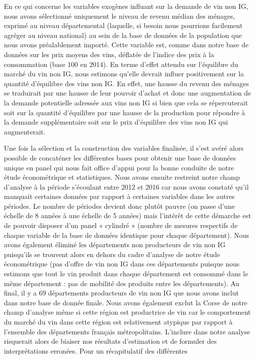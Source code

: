 \documentclass[11pt,]{article}
\begin{document}
En ce qui concerne les variables exogènes influant sur la demande de vin
non IG, nous avons sélectionné uniquement le niveau de revenu médian des
ménages, exprimé au niveau départemental (laquelle, si besoin nous
pourrions facilement agréger au niveau national) au sein de la base de
données de la population que nous avons préalablement importé. Cette
variable est, comme dans notre base de données sur les prix moyens des
vins, déflatée de l'indice des prix à la consommation (base 100 en
2014). En terme d'effet attendu sur l'équilibre du marché du vin non IG,
nous estimons qu'elle devrait influer positivement sur la quantité
d'équilibre des vins non IG. En effet, une hausse du revenu des ménages
se traduirait par une hausse de leur pouvoir d'achat et donc une
augmentation de la demande potentielle adressée aux vins non IG si bien
que cela se répercuterait soit sur la quantité d'équilibre par une
hausse de la production pour répondre à la demande supplémentaire soit
sur le prix d'équilibre des vins non IG qui augmenterait.

Une fois la sélection et la construction des variables finalisée, il
s'est avéré alors possible de concaténer les différentes bases pour
obtenir une base de données unique en panel qui nous fait office d'appui
pour la bonne conduite de notre étude économétrique et statistiques.
Nous avons ensuite restreint notre champ d'analyse à la période
s'écoulant entre 2012 et 2016 car nous avons constaté qu'il manquait
certaines données par rapport à certaines variables dans les autres
périodes. Le nombre de périodes devient donc plutôt pauvre (on passe
d'une échelle de 8 années à une échelle de 5 années) mais l'intérêt de
cette démarche est de pouvoir disposer d'un panel « cylindré » (nombre
de mesures respectifs de chaque variable de la base de données identique
pour chaque département). Nous avons également éliminé les départements
non producteurs de vin non IG puisqu'ils se trouvent alors en dehors du
cadre d'analyse de notre étude économétrique (pas d'offre de vin non IG
dans ces départements puisque nous estimons que tout le vin produit dans
chaque département est consommé dans le même département : pas de
mobilité des produits entre les départements). Au final, il y a 69
départements producteurs de vin non IG que nous avons inclut dans notre
base de donnée finale. Nous avons également exclut la Corse de notre
champ d'analyse même si cette région est productrice de vin car le
comportement du marché du vin dans cette région est relativement
atypique par rapport à l'ensemble des départements français
métropolitains. L'inclure dans notre analyse risquerait alors de biaiser
nos résultats d'estimation et de formuler des interprétations erronées.
Pour un récapitulatif des différentes
\end{document}
